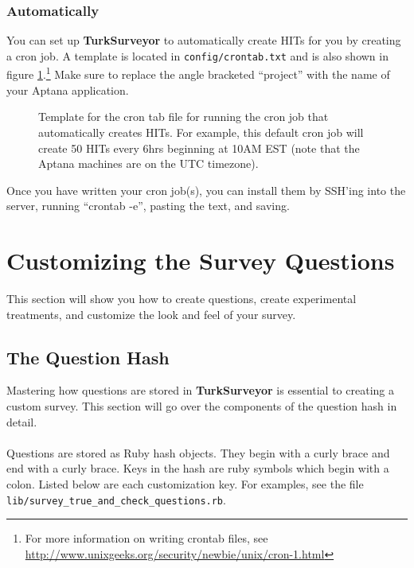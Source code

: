 \documentclass[12pt]{article}
\begin{document}
\subsubsection*{Automatically}

You can set up \textbf{TurkSurveyor} to automatically create HITs for you by creating a cron job. A template is located in {\tt{config/crontab.txt}} and is also shown in figure \ref{code:crontab.txt}.\footnote{For more information on writing crontab files, see \\ \href{http://www.unixgeeks.org/security/newbie/unix/cron-1.html}{http://www.unixgeeks.org/security/newbie/unix/cron-1.html}} Make sure to replace the angle bracketed ``project'' with the name of your Aptana application.


\begin{figure}[htp]
\centering

\caption{Template for the cron tab file for running the cron job that automatically creates HITs. For example, this default cron job will create 50 HITs every 6hrs beginning at 10AM EST (note that the Aptana machines are on the UTC timezone).}
\label{code:crontab.txt}
\end{figure}

Once you have written your cron job(s), you can install them by SSH'ing into the server, running ``crontab -e'', pasting the text, and saving.

\section{Customizing the Survey Questions}\label{sec:question_customization}

This section will show you how to create questions, create experimental treatments, and customize the look and feel of your survey.

\subsection{The Question Hash}\label{subsec:question_hash}

Mastering how questions are stored in \textbf{TurkSurveyor} is essential to creating a custom survey. This section will go over the components of the question hash in detail.\\
\\
Questions are stored as Ruby hash objects. They begin with a curly brace and end with a curly brace. Keys in the hash are ruby symbols which begin with a colon. Listed below are each customization key. For examples, see the file {\tt{lib/survey\_true\_and\_check\_questions.rb}}.
\end{document}
